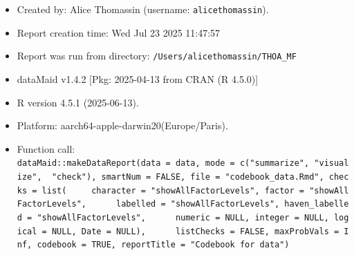 \documentclass[
  letterpaper,
  DIV=11,
  numbers=noendperiod]{scrartcl}
\begin{document}
\begin{itemize}
\item
  Created by: Alice Thomassin (username: \texttt{alicethomassin}).
\item
  Report creation time: Wed Jul 23 2025 11:47:57
\item
  Report was run from directory: \texttt{/Users/alicethomassin/THOA\_MF}
\item
  dataMaid v1.4.2 {[}Pkg: 2025-04-13 from CRAN (R 4.5.0){]}
\item
  R version 4.5.1 (2025-06-13).
\item
  Platform: aarch64-apple-darwin20(Europe/Paris).
\item
  Function call:
  \texttt{dataMaid::makeDataReport(data\ =\ data,\ mode\ =\ c("summarize",\ "visualize",\ \ "check"),\ smartNum\ =\ FALSE,\ file\ =\ "codebook\_data.Rmd",\ checks\ =\ list(\ \ \ \ \ character\ =\ "showAllFactorLevels",\ factor\ =\ "showAllFactorLevels",\ \ \ \ \ \ labelled\ =\ "showAllFactorLevels",\ haven\_labelled\ =\ "showAllFactorLevels",\ \ \ \ \ \ numeric\ =\ NULL,\ integer\ =\ NULL,\ logical\ =\ NULL,\ Date\ =\ NULL),\ \ \ \ \ \ listChecks\ =\ FALSE,\ maxProbVals\ =\ Inf,\ codebook\ =\ TRUE,\ reportTitle\ =\ "Codebook\ for\ data")}
\end{itemize}
\end{document}
